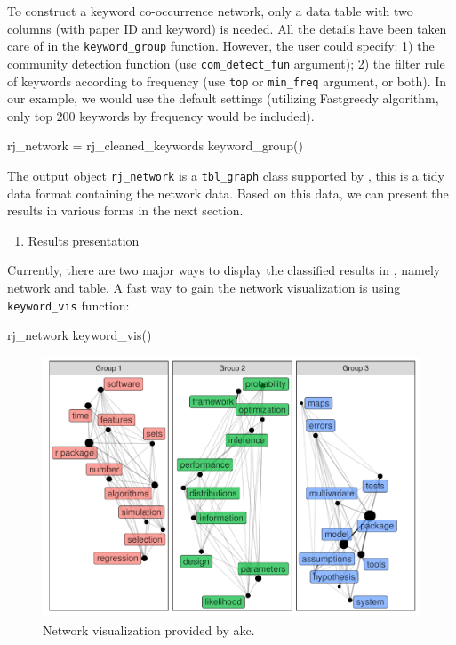 To construct a keyword co-occurrence network, only a data table with two
columns (with paper ID and keyword) is needed. All the details have been
taken care of in the \texttt{keyword\_group} function. However, the user
could specify: 1) the community detection function (use
\texttt{com\_detect\_fun} argument); 2) the filter rule of keywords
according to frequency (use \texttt{top} or \texttt{min\_freq} argument,
or both). In our example, we would use the default settings (utilizing
Fastgreedy algorithm, only top 200 keywords by frequency would be
included).

\begin{Schunk}
\begin{Sinput}
rj_network = rj_cleaned_keywords %
  keyword_group()
\end{Sinput}
\end{Schunk}

The output object \texttt{rj\_network} is a \texttt{tbl\_graph} class
supported by , this is a tidy data format containing
the network data. Based on this data, we can present the results in
various forms in the next section.

\begin{enumerate}
\def\labelenumi{(\arabic{enumi})}
\setcounter{enumi}{3}
\tightlist
\item
  Results presentation
\end{enumerate}

Currently, there are two major ways to display the classified results in
, namely network and table. A fast way to gain the network
visualization is using \texttt{keyword\_vis} function:

\begin{Schunk}
\begin{Sinput}
rj_network %
  keyword_vis()
\end{Sinput}
\begin{figure}

{\centering \includegraphics{article_files/figure-latex/fig4-1} 

}

\caption[Network visualization provided by akc]{Network visualization provided by akc.}\label{fig:fig4}
\end{figure}
\end{Schunk}

